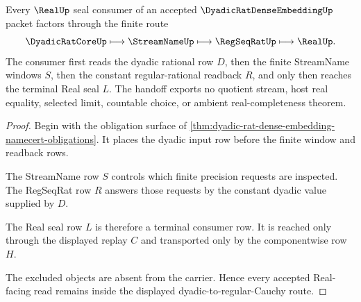\begin{theorem}
\label{thm:dyadic-rat-dense-embedding-real-seal-handoff}
Every $\RealUp$ seal consumer of an accepted $\DyadicRatDenseEmbeddingUp$ packet factors through the finite route
$$
\DyadicRatCoreUp
\longmapsto
\StreamNameUp
\longmapsto
\RegSeqRatUp
\longmapsto
\RealUp .
$$
The consumer first reads the dyadic rational row $D$, then the finite StreamName windows $S$, then the constant regular-rational readback $R$, and only then reaches the terminal Real seal $L$. The handoff exports no quotient stream, host real equality, selected limit, countable choice, or ambient real-completeness theorem.
\end{theorem}
\begin{proof}
Begin with the obligation surface of \autoref{thm:dyadic-rat-dense-embedding-namecert-obligations}. It places the dyadic input row before the finite window and readback rows.

The StreamName row $S$ controls which finite precision requests are inspected. The RegSeqRat row $R$ answers those requests by the constant dyadic value supplied by $D$.

The Real seal row $L$ is therefore a terminal consumer row. It is reached only through the displayed replay $C$ and transported only by the componentwise row $H$.

The excluded objects are absent from the carrier. Hence every accepted Real-facing read remains inside the displayed dyadic-to-regular-Cauchy route.
\end{proof}


